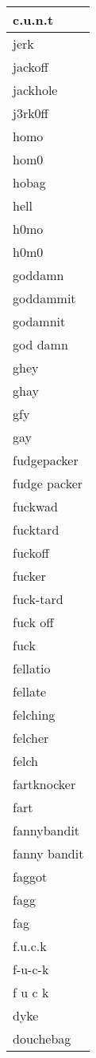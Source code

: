 \begin{longtable}{|l|}
c.u.n.t \\ \hline 
jerk \\ \hline 
jackoff \\ \hline 
jackhole \\ \hline 
j3rk0ff \\ \hline 
homo \\ \hline 
hom0 \\ \hline 
hobag \\ \hline 
hell \\ \hline 
h0mo \\ \hline 
h0m0 \\ \hline 
goddamn \\ \hline 
goddammit \\ \hline 
godamnit \\ \hline 
god damn \\ \hline 
ghey \\ \hline 
ghay \\ \hline 
gfy \\ \hline 
gay \\ \hline 
fudgepacker \\ \hline 
fudge packer \\ \hline 
fuckwad \\ \hline 
fucktard \\ \hline 
fuckoff \\ \hline 
fucker \\ \hline 
fuck-tard \\ \hline 
fuck off \\ \hline 
fuck \\ \hline 
fellatio \\ \hline 
fellate \\ \hline 
felching \\ \hline 
felcher \\ \hline 
felch \\ \hline 
fartknocker \\ \hline 
fart \\ \hline 
fannybandit \\ \hline 
fanny bandit \\ \hline 
faggot \\ \hline 
fagg \\ \hline 
fag \\ \hline 
f.u.c.k \\ \hline 
f-u-c-k \\ \hline 
f u c k \\ \hline 
dyke \\ \hline 
douchebag \\ \hline 

\end{longtable}

